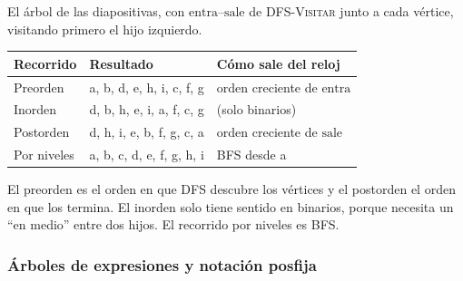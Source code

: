 \documentclass[11pt,letterpaper]{article}
\begin{document}
\begin{ejemplo}
  \label{ej:arbol-recorridos}
  El árbol de las diapositivas, con $\text{entra}$--$\text{sale}$ de
  \textsc{DFS-Visitar} junto a cada vértice, visitando primero el hijo
  izquierdo.
  \begin{center}
  \end{center}
  \begin{center}
  \small
  \begin{tabular}{lll}
    \toprule
    \textbf{Recorrido} & \textbf{Resultado}
      & \textbf{Cómo sale del reloj} \\
    \midrule
    Preorden & a, b, d, e, h, i, c, f, g
      & orden creciente de $\text{entra}$ \\
    Inorden & d, b, h, e, i, a, f, c, g & (solo binarios) \\
    Postorden & d, h, i, e, b, f, g, c, a
      & orden creciente de $\text{sale}$ \\
    Por niveles & a, b, c, d, e, f, g, h, i & BFS desde a \\
    \bottomrule
  \end{tabular}
  \end{center}
  El preorden es el orden en que DFS descubre los vértices y el
  postorden el orden en que los termina. El inorden solo tiene sentido
  en binarios, porque necesita un ``en medio'' entre dos hijos. El
  recorrido por niveles es BFS.
\end{ejemplo}

\subsubsection*{Árboles de expresiones y notación posfija}
\end{document}
